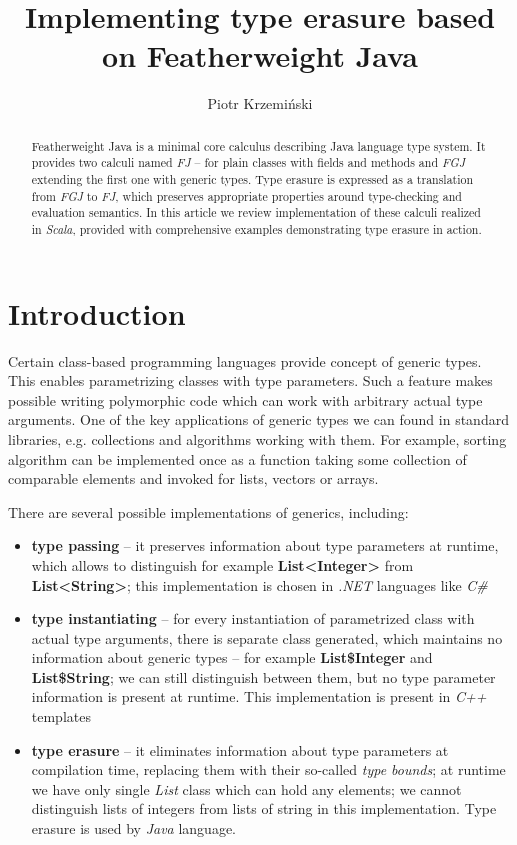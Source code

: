 \documentclass{article}[12pt]
\author{Piotr Krzemiński}
\title{Implementing type erasure based on Featherweight Java}
\date{}
\begin{document}
\maketitle


\begin{abstract}
Featherweight Java is a minimal core calculus describing Java language
type system. It provides two calculi named \emph{FJ} -- for plain
classes with fields and methods and \emph{FGJ} extending the first
one with generic types. Type erasure is expressed as a translation
from \emph{FGJ} to \emph{FJ}, which preserves appropriate properties
around type-checking and evaluation semantics. In this article
we review implementation of these calculi realized in \emph{Scala},
provided with comprehensive examples demonstrating type erasure in
action.
\end{abstract}


\section{Introduction}

Certain class-based programming languages provide concept of generic
types. This enables parametrizing classes with type parameters.
Such a feature makes possible writing polymorphic code which can
work with arbitrary actual type arguments. One of the key applications
of generic types we can found in standard libraries, e.g.
collections and algorithms working with them. For example,
sorting algorithm can be implemented once as a function taking some
collection of comparable elements and invoked for lists, vectors
or arrays.

There are several possible implementations of generics, including:

\begin{itemize}

\item{\textbf{type passing}} -- it preserves information about
  type parameters at runtime, which allows to distinguish
  for example \textbf{List<Integer>} from \textbf{List<String>}; 
  this implementation is chosen in \emph{.NET} languages like
  \emph{C\#}

\item{\textbf{type instantiating}} -- for every instantiation of
  parametrized class with actual type arguments, there is separate
  class generated, which maintains no information about generic
  types -- for example \textbf{List\$Integer} and \textbf{List\$String};
  we can still distinguish between them, but no type parameter
  information is present at runtime. This implementation is present
  in \emph{C++} templates

\item{\textbf{type erasure}} -- it eliminates information about
  type parameters at compilation time, replacing them with their
  so-called \emph{type bounds}; at runtime we have only single
  \emph{List} class which can hold any elements; we cannot
  distinguish lists of integers from lists of string in this
  implementation. Type erasure is used by \emph{Java} language.

\end{itemize}
\end{document}

